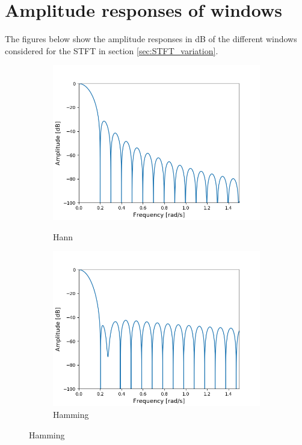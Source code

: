 \chapter{Amplitude responses of windows} \label{appD}
The figures below show the amplitude responses in dB of the different windows considered for the STFT in section \ref{sec:STFT_variation}.

\begin{figure}[H]
\centering
\begin{subfigure}{0.49\textwidth}
\centering
\includegraphics[width=\textwidth]{figures/dbplots/stft_bilag/64/hann.png}
\caption{Hann}
\includegraphics[width=\textwidth]{figures/dbplots/stft_bilag/64/hamming.png}
\caption{Hamming}

\end{subfigure}
\end{figure}
